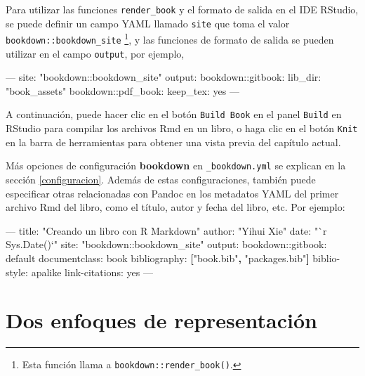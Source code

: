 \documentclass[12pt,]{krantz}
\makeatletter
\newenvironment{Shaded}{\begin{snugshade}}{\end{snugshade}}
\newcommand{\KeywordTok}[1]{\textcolor[rgb]{0.13,0.29,0.53}{\textbf{{#1}}}}
\newcommand{\StringTok}[1]{\textcolor[rgb]{0.31,0.60,0.02}{{#1}}}
\newcommand{\OtherTok}[1]{\textcolor[rgb]{0.56,0.35,0.01}{{#1}}}
\newcommand{\FunctionTok}[1]{\textcolor[rgb]{0.00,0.00,0.00}{{#1}}}
\newcommand{\NormalTok}[1]{{#1}}
\newenvironment{kframe}{%
\medskip{}
\setlength{\fboxsep}{.8em}
 \def\at@end@of@kframe{}%
 \ifinner\ifhmode%
  \def\at@end@of@kframe{\end{minipage}}%
  \begin{minipage}{\columnwidth}%
 \fi\fi%
 \def\FrameCommand##1{\hskip\@totalleftmargin \hskip-\fboxsep
 \colorbox{shadecolor}{##1}\hskip-\fboxsep
     \hskip-\linewidth \hskip-\@totalleftmargin \hskip\columnwidth}%
 \MakeFramed {\advance\hsize-\width
   \@totalleftmargin\z@ \linewidth\hsize
   \@setminipage}}%
 {\par\unskip\endMakeFramed%
 \at@end@of@kframe}
\renewenvironment{Shaded}{\begin{kframe}}{\end{kframe}}
\theoremstyle{definition}
\theoremstyle{definition}
\theoremstyle{remark}
\makeatother
\begin{document}
Para utilizar las funciones \texttt{render\_book} y el formato de salida
en el IDE RStudio, se puede definir un campo YAML llamado \texttt{site}
que toma el valor \texttt{bookdown::bookdown\_site} \footnote{Esta
  función llama a \texttt{bookdown::render\_book()}.}, y las funciones
de formato de salida se pueden utilizar en el campo \texttt{output}, por
ejemplo,

\begin{Shaded}
\begin{Highlighting}[]
\OtherTok{---}
\FunctionTok{site:} \StringTok{"bookdown::bookdown_site"}
\FunctionTok{output:}
  \FunctionTok{bookdown:}\NormalTok{:gitbook:}
    \FunctionTok{lib_dir:} \StringTok{"book_assets"}
  \FunctionTok{bookdown:}\NormalTok{:pdf_book:}
    \FunctionTok{keep_tex:} \NormalTok{yes}
\OtherTok{---}
\end{Highlighting}
\end{Shaded}

A continuación, puede hacer clic en el botón \texttt{Build\ Book} en el
panel \texttt{Build} en RStudio para compilar los archivos Rmd en un
libro, o haga clic en el botón \texttt{Knit} en la barra de herramientas
para obtener una vista previa del capítulo actual.

Más opciones de configuración \textbf{bookdown} en
\texttt{\_bookdown.yml} se explican en la sección \ref{configuracion}.
Además de estas configuraciones, también puede especificar otras
relacionadas con Pandoc en los metadatos YAML del primer archivo Rmd del
libro, como el título, autor y fecha del libro, etc. Por ejemplo:

\begin{Shaded}
\begin{Highlighting}[]
\OtherTok{--- }
\FunctionTok{title:} \StringTok{"Creando un libro con R Markdown"}
\FunctionTok{author:} \StringTok{"Yihui Xie"}
\FunctionTok{date:} \StringTok{"`r Sys.Date()`"}
\FunctionTok{site:} \StringTok{"bookdown::bookdown_site"}
\FunctionTok{output:}
  \FunctionTok{bookdown:}\NormalTok{:gitbook: default}
\FunctionTok{documentclass:} \NormalTok{book}
\FunctionTok{bibliography:} \KeywordTok{[}\StringTok{"book.bib"}\KeywordTok{,} \StringTok{"packages.bib"}\KeywordTok{]}
\FunctionTok{biblio-style:} \NormalTok{apalike}
\FunctionTok{link-citations:} \NormalTok{yes}
\OtherTok{---}
\end{Highlighting}
\end{Shaded}

\section{Dos enfoques de representación}\label{new-session}
\end{document}
